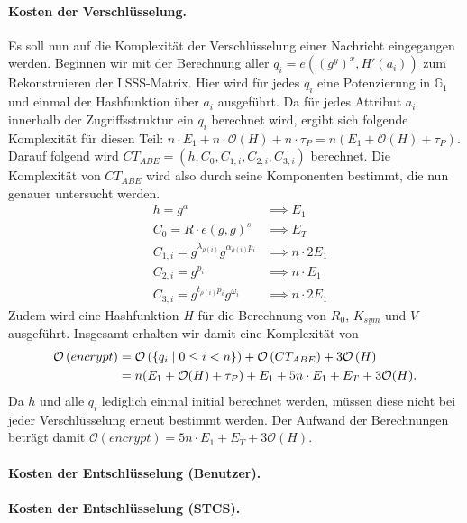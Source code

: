 \paragraph{Kosten der Verschlüsselung.}
Es soll nun auf die Komplexität der Verschlüsselung einer Nachricht eingegangen
werden. Beginnen wir mit der Berechnung aller $q_i = e\left((g^y)^x,
H'(a_i)\right)$ zum Rekonstruieren der LSSS-Matrix. Hier wird für jedes $q_i$
eine Potenzierung in $\mathbb{G}_1$ und einmal der Hashfunktion über $a_i$
ausgeführt. Da für jedes Attribut $a_i$ innerhalb der Zugriffsstruktur ein $q_i$
berechnet wird, ergibt sich folgende Komplexität für diesen Teil: $n \cdot E_1 +
n \cdot \mathcal{O}(H) + n \cdot \tau_P = n (E_1 + \mathcal{O}(H) + \tau_P)$.
Darauf folgend wird $CT_{ABE} = (h, C_0, C_{1,i}, C_{2,i}, C_{3,i})$ berechnet.
Die Komplexität von $CT_{ABE}$ wird also durch seine Komponenten bestimmt, die
nun genauer untersucht werden.
\begin{align*}
  & h = g^a & \implies E_1 \\
  & C_0 = R \cdot e(g, g)^s & \implies E_T \\
  & C_{1,i} = g^{\lambda_{\rho(i)}}g^{\alpha_{\rho(i)}p_i} & \implies n \cdot 2E_1 \\
  & C_{2,i} = g^{p_i} & \implies n \cdot E_1 \\
  & C_{3,i} = g^{t_{\rho(i)}p_i}g^{\omega_i} & \implies n \cdot 2E_1
\end{align*}
Zudem wird eine Hashfunktion $H$ für die Berechnung von $R_0$, $K_{sym}$ und $V$
ausgeführt. Insgesamt erhalten wir damit eine Komplexität von
\begin{align*}
  \mathcal{O} \left( encrypt \right) &= \mathcal{O} \left( \{ q_i \;\vert\; 0 \leq i < n \} \right) + \mathcal{O} \left( CT_{ABE} \right) + 3\mathcal{O} \left( H \right) \\
  &= n (E_1 + \mathcal{O}(H) + \tau_P) + E_1 + 5n \cdot E_1
  + E_T + 3\mathcal{O}(H).
\end{align*}
Da $h$ und alle $q_i$ lediglich einmal initial berechnet werden,
müssen diese nicht bei jeder Verschlüsselung erneut bestimmt werden. Der Aufwand
der Berechnungen beträgt damit $\mathcal{O}(encrypt) = 5n \cdot E_1 + E_T +
3\mathcal{O}(H)$.

\paragraph{Kosten der Entschlüsselung (Benutzer).}


\paragraph{Kosten der Entschlüsselung (STCS).}
